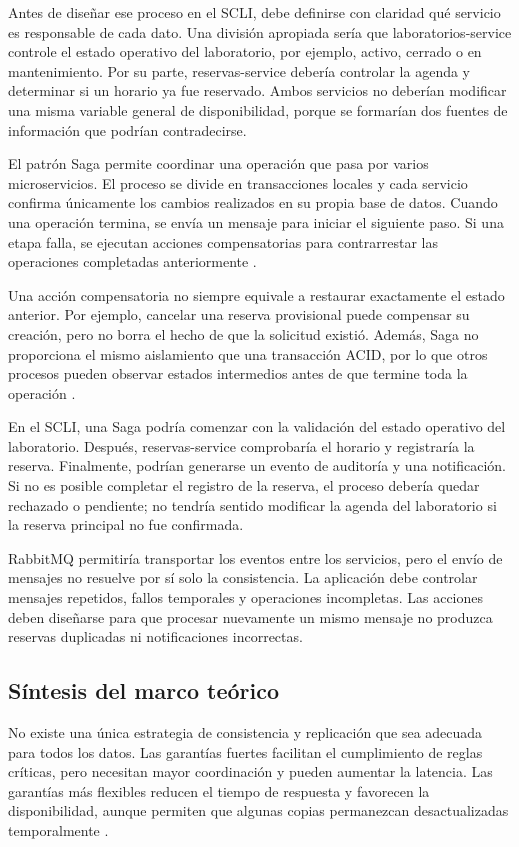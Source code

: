 \documentclass[conference]{IEEEtran}
\begin{document}
Antes de diseñar ese proceso en el SCLI, debe definirse con claridad qué servicio es responsable de cada dato. Una división apropiada sería que laboratorios-service controle el estado operativo del laboratorio, por ejemplo, activo, cerrado o en mantenimiento. Por su parte, reservas-service debería controlar la agenda y determinar si un horario ya fue reservado. Ambos servicios no deberían modificar una misma variable general de disponibilidad, porque se formarían dos fuentes de información que podrían contradecirse.

El patrón Saga permite coordinar una operación que pasa por varios microservicios. El proceso se divide en transacciones locales y cada servicio confirma únicamente los cambios realizados en su propia base de datos. Cuando una operación termina, se envía un mensaje para iniciar el siguiente paso. Si una etapa falla, se ejecutan acciones compensatorias para contrarrestar las operaciones completadas anteriormente \cite{ref6}.

Una acción compensatoria no siempre equivale a restaurar exactamente el estado anterior. Por ejemplo, cancelar una reserva provisional puede compensar su creación, pero no borra el hecho de que la solicitud existió. Además, Saga no proporciona el mismo aislamiento que una transacción ACID, por lo que otros procesos pueden observar estados intermedios antes de que termine toda la operación \cite{ref6}.

En el SCLI, una Saga podría comenzar con la validación del estado operativo del laboratorio. Después, reservas-service comprobaría el horario y registraría la reserva. Finalmente, podrían generarse un evento de auditoría y una notificación. Si no es posible completar el registro de la reserva, el proceso debería quedar rechazado o pendiente; no tendría sentido modificar la agenda del laboratorio si la reserva principal no fue confirmada.

RabbitMQ permitiría transportar los eventos entre los servicios, pero el envío de mensajes no resuelve por sí solo la consistencia. La aplicación debe controlar mensajes repetidos, fallos temporales y operaciones incompletas. Las acciones deben diseñarse para que procesar nuevamente un mismo mensaje no produzca reservas duplicadas ni notificaciones incorrectas.

\subsection{Síntesis del marco teórico}
No existe una única estrategia de consistencia y replicación que sea adecuada para todos los datos. Las garantías fuertes facilitan el cumplimiento de reglas críticas, pero necesitan mayor coordinación y pueden aumentar la latencia. Las garantías más flexibles reducen el tiempo de respuesta y favorecen la disponibilidad, aunque permiten que algunas copias permanezcan desactualizadas temporalmente \cite{ref1}.
\end{document}
